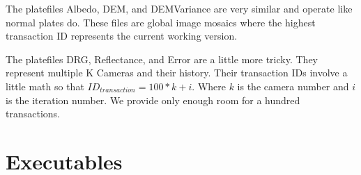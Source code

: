 The platefiles Albedo, DEM, and DEMVariance are very similar and
operate like normal plates do. These files are global image mosaics
where the highest transaction ID represents the current working
version.


The platefiles DRG, Reflectance, and Error are a little more
tricky. They represent multiple K Cameras and their history. Their
transaction IDs involve a little math so that $ID_{transaction} =
100*k+i$. Where $k$ is the camera number and $i$ is the iteration
number. We provide only enough room for a hundred transactions.



\section{Executables}



